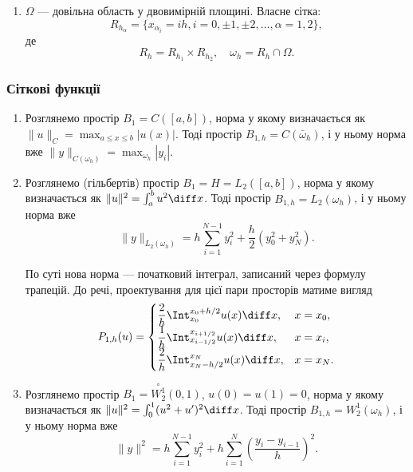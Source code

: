 \begin{enumerate}
    \item $\Omega$ --- довільна область у двовимірній площині. Власне сітка:
    \begin{equation}
        \label{eq:4.2.10}
        R_{h_\alpha} = \{x_{\alpha_i} = i h, i = 0, \pm 1, \pm 2, \ldots, \alpha = 1, 2\},
    \end{equation}
    де
    \begin{equation}
        \label{eq:4.2.11}
        R_h = R_{h_1} \times R_{h_2}, \quad \omega_h = R_h \cap \Omega.
    \end{equation}
\end{enumerate}

\subsubsection{Сіткові функції}

\begin{enumerate}
    \item Розглянемо простір $B_1 = C([a, b])$, норма у якому визначається як $\|u\|_C = \max_{a \le x \le b} |u(x)|$. Тоді простір
    $B_{1,h} = C(\bar \omega_h)$, і у ньому норма вже $\|y\|_{C(\omega_h)} = \max_{\omega_h} |y_i|$.

    \item Розглянемо (гільбертів) простір $B_1 = H = L_2([a, b])$, норма у якому визначається як $\|u\|^2 = \int_a^b u^2 \diff x$. Тоді простір $B_{1,h} = L_2(\omega_h)$, і у ньому норма вже
    \begin{equation}
        \label{eq:4.2.12}
        \|y\|_{L_2(\omega_h)} = h \sum_{i = 1}^{N - 1} y_i^2 + \frac{h}{2} (y_0^2 + y_N^2).
    \end{equation}
    
    По суті нова норма --- початковий інтеграл, записаний через формулу трапецій. До речі, проектування для цієї пари просторів матиме вигляд
    \begin{equation}
        \label{eq:4.2.14}
        P_{1,h}(u) = \begin{cases}
            \dfrac{2}{h} \Int_{x_0}^{x_0 + h/2} u(x) \diff x, & x = x_0, \\[.5ex]
            \dfrac{1}{h} \Int_{x_{i - 1/2}}^{x_{i + 1/2}} u(x) \diff x, & x = x_i, \\[.5ex]
            \dfrac{2}{h} \Int_{x_N - h/2}^{x_N} u(x) \diff x, & x = x_N.
        \end{cases}
    \end{equation}

    \item Розглянемо простір $B_1 = \overset{\circ}{W_2^1}(0,1)$, $u(0) = u(1) = 0$, норма у якому визначається як $\|u\|^2 = \int_0^1 (u^2 + u')^2 \diff x$. Тоді простір $B_{1,h} = W_2^1(\omega_h)$, і у ньому норма вже
    \begin{equation}
        \label{eq:4.2.15}
        \|y\|^2 = h \sum_{i = 1}^{N - 1} y_i^2 + h \sum_{i = 1}^N \left( \frac{y_i - y_{i - 1}}{h} \right)^2.
    \end{equation}
\end{enumerate}

